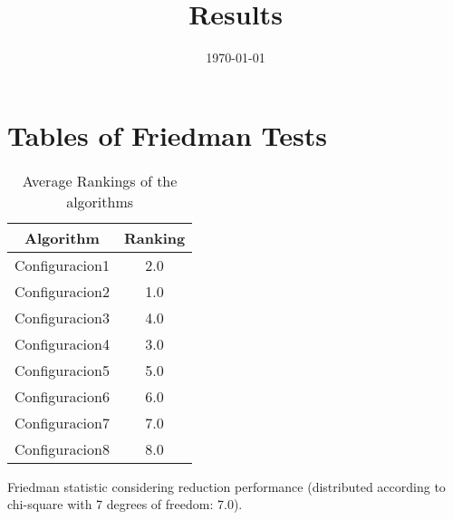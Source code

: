 \documentclass{article}
\title{Results}
\author{}
\date{\today}
\begin{document}
\oddsidemargin 0in \topmargin 0in\maketitle
\section{Tables of Friedman Tests}
\begin{table}[!htp]
\centering
\caption{Average Rankings of the algorithms
}\begin{tabular}{c|c}
Algorithm&Ranking\\
\hline
Configuracion1&2.0\\
Configuracion2&1.0\\
Configuracion3&4.0\\
Configuracion4&3.0\\
Configuracion5&5.0\\
Configuracion6&6.0\\
Configuracion7&7.0\\
Configuracion8&8.0\\
\end{tabular}
\end{table}


Friedman statistic considering reduction performance (distributed according to chi-square with 7 degrees of freedom: 7.0).
\end{document}
